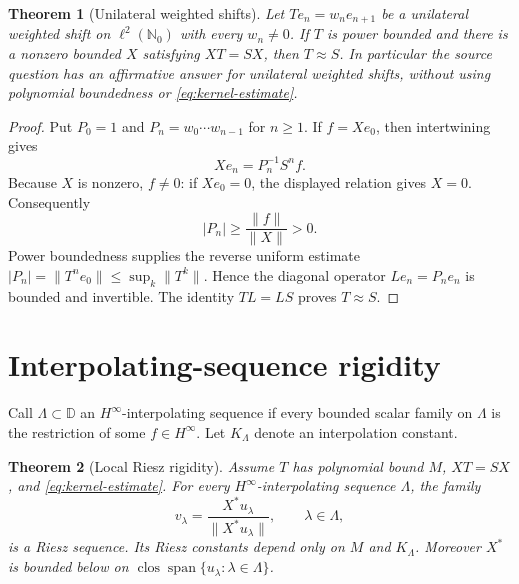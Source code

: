 \documentclass[11pt]{article}
\newtheorem{theorem}{Theorem}
\newcommand{\D}{\mathbb D}
\newcommand{\clos}{\operatorname{clos}}
\begin{document}
\begin{theorem}[Unilateral weighted shifts]\label{thm:weighted}
Let $T e_n=w_ne_{n+1}$ be a unilateral weighted shift on $\ell^2(\mathbb
N_0)$ with every $w_n\neq0$.  If $T$ is power bounded and there is a
nonzero bounded $X$ satisfying $XT=SX$, then $T\approx S$.
In particular the source question has an affirmative answer for unilateral
weighted shifts, without using polynomial boundedness or
\eqref{eq:kernel-estimate}.
\end{theorem}

\begin{proof}
Put $P_0=1$ and $P_n=w_0\cdots w_{n-1}$ for $n\geq1$.  If $f=Xe_0$, then
intertwining gives
\[
 Xe_n=P_n^{-1}S^nf.
\]
Because $X$ is nonzero, $f\neq0$: if $Xe_0=0$, the displayed relation gives
$X=0$.  Consequently
\[
 |P_n|\geq\frac{\|f\|}{\|X\|}>0.
\]
Power boundedness supplies the reverse uniform estimate
$|P_n|=\|T^ne_0\|\leq\sup_k\|T^k\|$.  Hence the diagonal operator
$Le_n=P_ne_n$ is bounded and invertible.  The identity $TL=LS$ proves
$T\approx S$.
\end{proof}

\section{Interpolating-sequence rigidity}

Call $\Lambda\subset\D$ an $H^\infty$-interpolating sequence if every
bounded scalar family on $\Lambda$ is the restriction of some
$f\in H^\infty$.  Let $K_\Lambda$ denote an interpolation constant.

\begin{theorem}[Local Riesz rigidity]\label{thm:riesz}
Assume $T$ has polynomial bound $M$, $XT=SX$, and
\eqref{eq:kernel-estimate}.  For every $H^\infty$-interpolating sequence
$\Lambda$, the family
\[
 v_\lambda=\frac{X^*u_\lambda}{\|X^*u_\lambda\|},
 \qquad \lambda\in\Lambda,
\]
is a Riesz sequence.  Its Riesz constants depend only on $M$ and
$K_\Lambda$.  Moreover $X^*$ is bounded below on
$\clos\operatorname{span}\{u_\lambda:\lambda\in\Lambda\}$.
\end{theorem}
\end{document}
